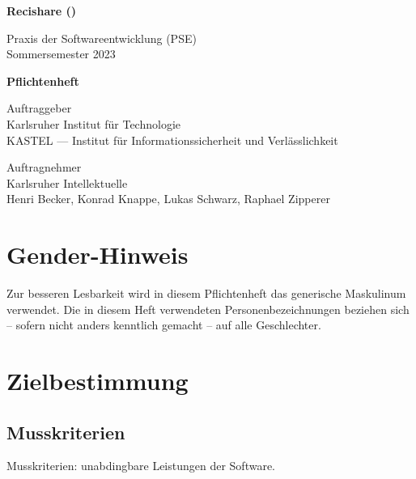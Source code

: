 \documentclass[parskip=full]{scrartcl}
\begin{document}
\begin{titlepage}
    \begin{center}
        \begin{Huge}
            {\textbf{Recishare ()}}
        \end{Huge}
        \vspace{12px}

        Praxis der Softwareentwicklung (PSE)\\
        Sommersemester 2023\\
        \vspace{170px}

        \begin{huge}
            {\textbf{Pflichtenheft}}
        \end{huge}
        \vspace{12px}

        Auftraggeber\\
        Karlsruher Institut für Technologie\\
        KASTEL — Institut für Informationssicherheit und Verlässlichkeit\\
        \vspace{310px}

        Auftragnehmer\\
        Karlsruher Intellektuelle\\
        Henri Becker, Konrad Knappe, Lukas Schwarz, Raphael Zipperer\\
    \end{center}
\end{titlepage}

\tableofcontents

\vspace{32px}
\section*{Gender-Hinweis}
Zur besseren Lesbarkeit wird in diesem Pflichtenheft das generische Maskulinum verwendet.
Die in diesem Heft verwendeten Personenbezeichnungen beziehen sich – sofern nicht anders kenntlich gemacht – auf alle Geschlechter.
\newpage


\section{Zielbestimmung}

\subsection{Musskriterien}
Musskriterien: unabdingbare Leistungen der Software.
\end{document}
